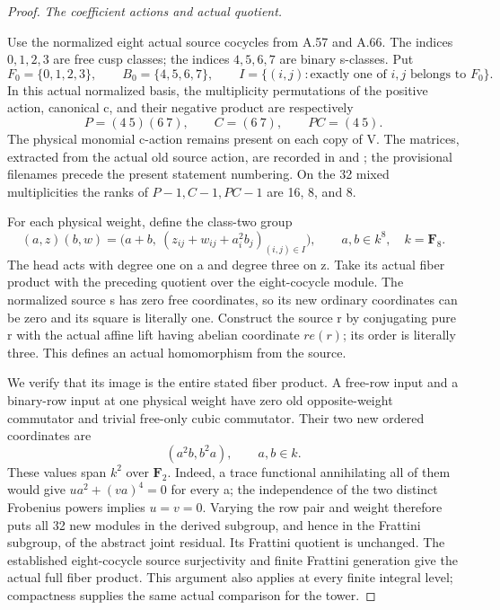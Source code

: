 \begin{proof}
\emph{The coefficient actions and actual quotient.}\par
Use the normalized eight actual source cocycles from A.57 and A.66.
The indices \(0,1,2,3\) are free cusp classes; the indices
\(4,5,6,7\) are binary s-classes. Put
\[
 F_0=\{0,1,2,3\},\qquad B_0=\{4,5,6,7\},\qquad
 I=\{(i,j):\text{exactly one of }i,j\text{ belongs to }F_0\}.
 \tag{A.72.1}
\]
In this actual normalized basis, the multiplicity permutations of the
positive action, canonical c, and their negative product are respectively
\[
 P=(4\ 5)(6\ 7),\qquad C=(6\ 7),\qquad PC=(4\ 5).
 \tag{A.72.2}
\]
The physical monomial c-action remains present on each copy of V.
The matrices, extracted from the actual old source action, are recorded
in  and
; the provisional
filenames precede the present statement numbering. On the 32 mixed
multiplicities the ranks of \(P-1,C-1,PC-1\) are 16, 8, and 8.

For each physical weight, define the class-two group
\[
 (a,z)(b,w)=
 \bigl(a+b,\ (z_{ij}+w_{ij}+a_i^2b_j)_{(i,j)\in I}\bigr),
 \qquad a,b\in k^8,\quad k=\mathbf F_8.
 \tag{A.72.3}
\]
The head acts with degree one on a and degree three on z. Take its
actual fiber product with the preceding quotient over the eight-cocycle
module. The normalized source s has zero free coordinates, so its new
ordinary coordinates can be zero and its square is literally one.
Construct the source r by conjugating pure r with the actual affine
lift having abelian coordinate \(r e(r)\); its order is literally three.
This defines an actual homomorphism from the source.

We verify that its image is the entire stated fiber product. A free-row
input and a binary-row input at one physical weight have zero old
opposite-weight commutator and trivial free-only cubic commutator.
Their two new ordered coordinates are
\[
 (a^2b,b^2a),\qquad a,b\in k.
 \tag{A.72.4}
\]
These values span \(k^2\) over \(\mathbf F_2\). Indeed, a trace
functional annihilating all of them would give
\(u a^2+(v a)^4=0\) for every a; the independence of the two distinct
Frobenius powers implies \(u=v=0\). Varying the row pair and weight
therefore puts all 32 new modules in the derived subgroup, and hence
in the Frattini subgroup, of the abstract joint residual. Its Frattini
quotient is unchanged. The established eight-cocycle source
surjectivity and finite Frattini generation give the actual full
fiber product. This argument also applies at every finite integral
level; compactness supplies the same actual comparison for the tower.


\end{proof}
